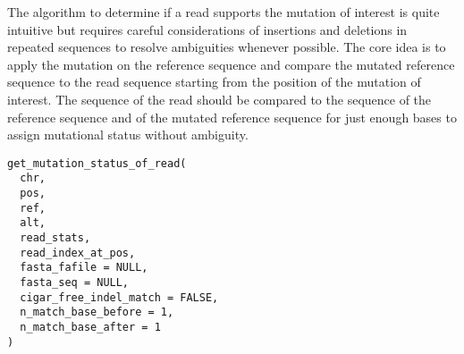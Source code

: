 \documentclass[a4paper]{book}
\begin{document}
%
\begin{Description}
The algorithm to determine if a read supports the mutation of interest is quite intuitive but requires careful
considerations of insertions and deletions in repeated sequences to resolve ambiguities whenever possible. The core
idea is to apply the mutation on the reference sequence and compare the mutated reference sequence to the read
sequence starting from the position of the mutation of interest. The sequence of the read should be compared to the
sequence of the reference sequence and of the mutated reference sequence for just enough bases to assign mutational
status without ambiguity.
\end{Description}
%
\begin{Usage}
\begin{verbatim}
get_mutation_status_of_read(
  chr,
  pos,
  ref,
  alt,
  read_stats,
  read_index_at_pos,
  fasta_fafile = NULL,
  fasta_seq = NULL,
  cigar_free_indel_match = FALSE,
  n_match_base_before = 1,
  n_match_base_after = 1
)
\end{verbatim}
\end{Usage}
%
\end{document}
